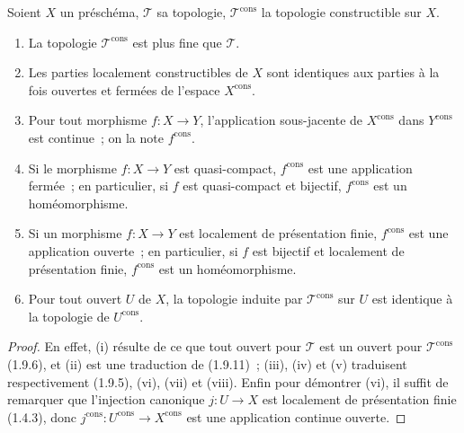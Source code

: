 \begin{proposition}[1.9.14]
\label{IV.1.9.14-fr}
Soient $X$ un préschéma, $\mathscr T$ sa topologie,
$\mathscr T^{\mathrm{cons}}$ la topologie constructible sur $X$.
\begin{enumerate}
  \item[\textup{(i)}] La topologie $\mathscr T^{\mathrm{cons}}$ est plus fine que
  $\mathscr T$.
  \item[\textup{(ii)}] Les parties localement constructibles de $X$ sont identiques
  aux parties à la fois ouvertes et fermées de l'espace $X^{\mathrm{cons}}$.
  \item[\textup{(iii)}] Pour tout morphisme $f:X\to Y$, l'application sous-jacente de
  $X^{\mathrm{cons}}$ dans $Y^{\mathrm{cons}}$ est continue~; on la note
  $f^{\mathrm{cons}}$.
  \item[\textup{(iv)}] Si le morphisme $f:X\to Y$ est quasi-compact,
  $f^{\mathrm{cons}}$ est une application fermée~; en particulier, si $f$
  est quasi-compact et bijectif, $f^{\mathrm{cons}}$ est un homéomorphisme.
  \item[\textup{(v)}] Si un morphisme $f:X\to Y$ est localement de présentation
  finie, $f^{\mathrm{cons}}$ est une application ouverte~; en particulier,
  si $f$ est bijectif et localement de présentation finie,
  $f^{\mathrm{cons}}$ est un homéomorphisme.
  \item[\textup{(vi)}] Pour tout ouvert $U$ de $X$, la topologie induite par
  $\mathscr T^{\mathrm{cons}}$ sur $U$ est identique à la topologie de
  $U^{\mathrm{cons}}$.
\end{enumerate}
\end{proposition}

\begin{proof}
En effet, (i) résulte de ce que tout ouvert pour $\mathscr T$ est un ouvert
pour $\mathscr T^{\mathrm{cons}}$ (1.9.6), et (ii) est une traduction de
(1.9.11)~; (iii), (iv) et (v) traduisent respectivement (1.9.5), (vi), (vii)
et (viii). Enfin pour démontrer (vi), il suffit de remarquer que l'injection
canonique $j:U\to X$ est localement de présentation finie (1.4.3), donc
$j^{\mathrm{cons}}:U^{\mathrm{cons}}\to X^{\mathrm{cons}}$ est une
application continue ouverte.
\end{proof}

